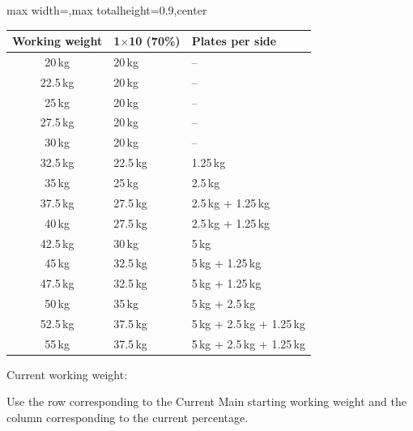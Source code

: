 \documentclass[11pt,a4paper]{article}
\newcommand{\tablearraystretch}{1.15}
\begin{document}
\begin{center}
\renewcommand{\arraystretch}{\tablearraystretch}
\begin{adjustbox}{max width=\linewidth,max totalheight=0.9\textheight,center}
\begin{tabular}{cll}
\toprule
Working weight & 1$\times$10 (70\%) & Plates per side \\
\midrule
20\,kg   & 20\,kg   & -- \\
22.5\,kg & 20\,kg   & -- \\
25\,kg   & 20\,kg   & -- \\
27.5\,kg & 20\,kg   & -- \\
30\,kg   & 20\,kg   & -- \\
32.5\,kg & 22.5\,kg & 1.25\,kg \\
35\,kg   & 25\,kg   & 2.5\,kg \\
37.5\,kg & 27.5\,kg & 2.5\,kg + 1.25\,kg \\
40\,kg   & 27.5\,kg & 2.5\,kg + 1.25\,kg \\
42.5\,kg & 30\,kg   & 5\,kg \\
45\,kg   & 32.5\,kg & 5\,kg + 1.25\,kg \\
47.5\,kg & 32.5\,kg & 5\,kg + 1.25\,kg \\
50\,kg   & 35\,kg   & 5\,kg + 2.5\,kg \\
52.5\,kg & 37.5\,kg & 5\,kg + 2.5\,kg + 1.25\,kg \\
55\,kg   & 37.5\,kg & 5\,kg + 2.5\,kg + 1.25\,kg \\
\bottomrule
\end{tabular}
\end{adjustbox}
\renewcommand{\arraystretch}{1}
\end{center}

Current working weight:

Use the row corresponding to the Current Main starting working weight and the column corresponding to the current percentage.
\end{document}
